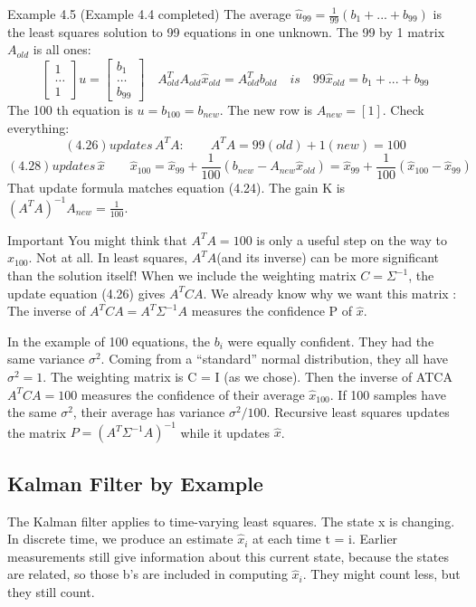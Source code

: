 Example 4.5\; (Example 4.4 completed) The average $\hat{u}_{99}=\frac{1}{99}(b_1+...+b_99)$ is the least squares solution to 99 equations in one unknown. The 99 by 1 matrix $A_{old}$ is all ones:
\begin{equation*}
\begin{bmatrix}
1 \\ \dots \\ 1
\end{bmatrix}
u=
\begin{bmatrix}
b_1 \\ \dots \\ b_{99}
\end{bmatrix}
\quad
A^T_{old}A_{old}\hat{x}_{old}=A^T_{old}b_{old}
\quad is \quad
99\hat{x}_{old}=b_1+...+b_{99}
\end{equation*} 
The 100 th equation is $u=b_{100}=b_{new}$. The new row is $A_{new}=[1]$. Check everything:
\begin{equation*}
(4.26) updates \,A^TA: \qquad
A^TA=99(old)+1(new)=100
\end{equation*}
\begin{equation*}
(4.28) updates \,\hat{x} \qquad
\hat{x}_{100}=\hat{x}_{99}+\frac{1}{100}(b_{new}-A_{new}\hat{x}_{old})=\hat{x}_{99}+\frac{1}{100}(\hat{x}_{100}-\hat{x}_{99})
\end{equation*}
That update formula matches equation (4.24). The gain K is $(A^TA)^{-1}A_{new}=\frac{1}{100}$.

Important You might think that $A^TA=100$ is only a useful step on the way to $\hat{x}_{100}$. Not at all. In least squares, $A^TA$(and its inverse) can be more significant than the solution itself!
When we include the weighting matrix $C=\Sigma^{-1}$, the update equation (4.26) gives $A^TCA$.
We already know why we want this matrix : The inverse of $A^TCA=A^T\Sigma^{-1}A$ measures the confidence P of $\hat{x}$.

In the example of 100 equations, the $b_i$ were equally confident. They had the same variance $\sigma^2$. Coming from a “standard” normal distribution, they all have $\sigma^2=1$. The
weighting matrix is C = I (as we chose). Then the inverse of ATCA$A^TCA=100$ measures
the confidence of their average $\hat{x}_100$. If 100 samples have the same $\sigma^2$, their average has variance $\sigma^2/100$. Recursive least squares updates the matrix $P=(A^T\Sigma^{-1}A)^{-1}$ while it updates $\hat{x}$. 

	\subsection{Kalman Filter by Example}
	The Kalman filter applies to time-varying least squares. The state x is changing. In discrete
	time, we produce an estimate $\hat{x}_i$ at each time t = i. Earlier measurements still give
	information about this current state, because the states are related, so those b's are included
	in computing $\hat{x}_i$. They might count less, but they still count.
	
